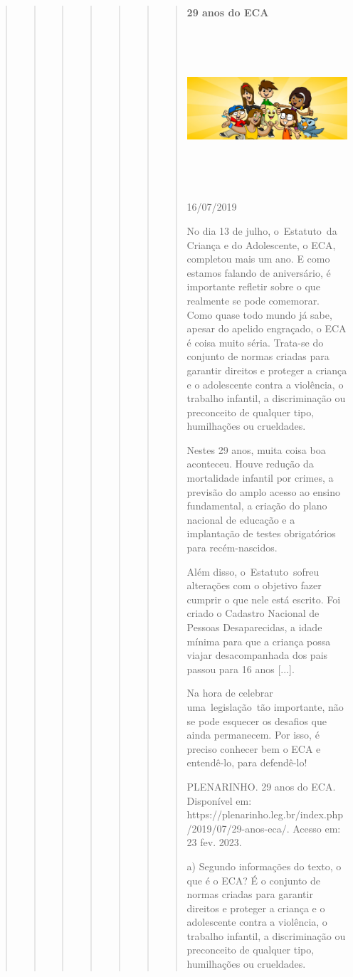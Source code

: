 \begin{quote}
\begin{quote}
\begin{quote}
\begin{quote}
\begin{quote}
\begin{quote}
\begin{quote}
\textbf{29 anos do ECA}

\includegraphics[width=5.90556in,height=2.30417in]{media/image26.jpeg}

16/07/2019~

No dia 13 de julho, o~Estatuto~da Criança e do Adolescente, o ECA,
completou mais um ano. E como estamos falando de aniversário, é
importante refletir sobre o que realmente se pode comemorar. Como quase
todo mundo já sabe, apesar do apelido engraçado, o ECA é coisa muito
séria. Trata-se do conjunto de normas criadas para garantir direitos e
proteger a criança e o adolescente contra a violência, o trabalho
infantil, a discriminação ou preconceito de qualquer tipo, humilhações
ou crueldades.

Nestes 29 anos, muita coisa boa aconteceu. Houve redução da mortalidade
infantil por crimes, a previsão do amplo acesso ao ensino fundamental, a
criação do plano nacional de educação e a implantação de testes
obrigatórios para recém-nascidos.

\protect\hypertarget{_Hlk128033654}{}{}Além disso, o~Estatuto~sofreu
alterações com o objetivo fazer cumprir o que nele está escrito. Foi
criado o Cadastro Nacional de Pessoas Desaparecidas, a idade mínima para
que a criança possa viajar desacompanhada dos pais passou para 16 anos
{[}...{]}.

Na hora de celebrar uma~legislação~tão importante, não se pode esquecer
os desafios que ainda permanecem. Por isso, é preciso conhecer bem o ECA
e entendê-lo, para defendê-lo!

PLENARINHO. 29 anos do ECA. Disponível em:
https://plenarinho.leg.br/index.php/2019/07/29-anos-eca/. Acesso em: 23
fev. 2023.

a) Segundo informações do texto, o que é o ECA? É o conjunto de normas
criadas para garantir direitos e proteger a criança e o adolescente
contra a violência, o trabalho infantil, a discriminação ou preconceito
de qualquer tipo, humilhações ou crueldades.


\end{quote}
\end{quote}
\end{quote}
\end{quote}
\end{quote}
\end{quote}
\end{quote}
